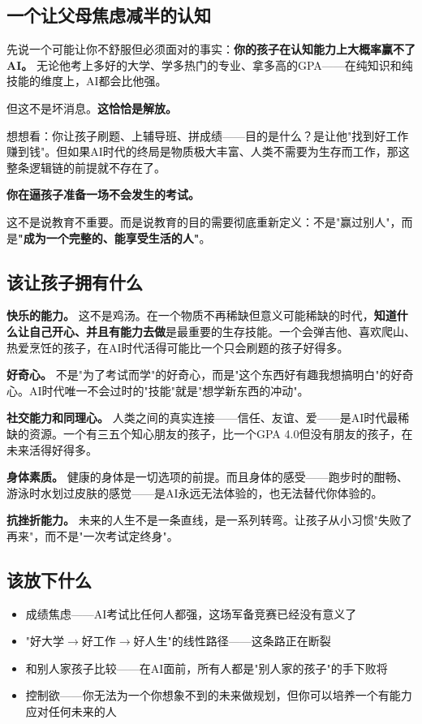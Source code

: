 \documentclass[a4paper,12pt,UTF8]{ctexart}
\begin{document}
\subsection{一个让父母焦虑减半的认知}

先说一个可能让你不舒服但必须面对的事实：\textbf{你的孩子在认知能力上大概率赢不了AI。} 无论他考上多好的大学、学多热门的专业、拿多高的GPA——在纯知识和纯技能的维度上，AI都会比他强。

但这不是坏消息。\textbf{这恰恰是解放。}

想想看：你让孩子刷题、上辅导班、拼成绩——目的是什么？是让他"找到好工作赚到钱"。但如果AI时代的终局是物质极大丰富、人类不需要为生存而工作，那这整条逻辑链的前提就不存在了。

\textbf{你在逼孩子准备一场不会发生的考试。}

这不是说教育不重要。而是说教育的目的需要彻底重新定义：不是"赢过别人"，而是\textbf{"成为一个完整的、能享受生活的人"}。

\subsection{该让孩子拥有什么}

\textbf{快乐的能力。} 这不是鸡汤。在一个物质不再稀缺但意义可能稀缺的时代，\textbf{知道什么让自己开心、并且有能力去做}是最重要的生存技能。一个会弹吉他、喜欢爬山、热爱烹饪的孩子，在AI时代活得可能比一个只会刷题的孩子好得多。

\textbf{好奇心。} 不是"为了考试而学"的好奇心，而是"这个东西好有趣我想搞明白"的好奇心。AI时代唯一不会过时的"技能"就是"想学新东西的冲动"。

\textbf{社交能力和同理心。} 人类之间的真实连接——信任、友谊、爱——是AI时代最稀缺的资源。一个有三五个知心朋友的孩子，比一个GPA 4.0但没有朋友的孩子，在未来活得好得多。

\textbf{身体素质。} 健康的身体是一切选项的前提。而且身体的感受——跑步时的酣畅、游泳时水划过皮肤的感觉——是AI永远无法体验的，也无法替代你体验的。

\textbf{抗挫折能力。} 未来的人生不是一条直线，是一系列转弯。让孩子从小习惯"失败了再来"，而不是"一次考试定终身"。

\subsection{该放下什么}

\begin{itemize}
\item 成绩焦虑——AI考试比任何人都强，这场军备竞赛已经没有意义了
\item "好大学$\to$好工作$\to$好人生"的线性路径——这条路正在断裂
\item 和别人家孩子比较——在AI面前，所有人都是"别人家的孩子"的手下败将
\item 控制欲——你无法为一个你想象不到的未来做规划，但你可以培养一个有能力应对任何未来的人
\end{itemize}
\end{document}
